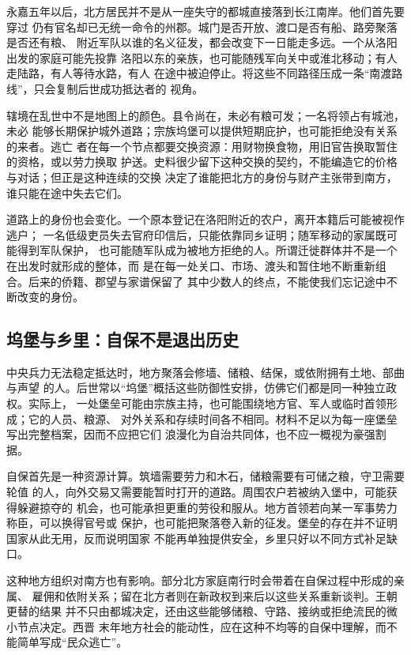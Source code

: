 永嘉五年以后，北方居民并不是从一座失守的都城直接落到长江南岸。他们首先要穿过
仍有官名却已无统一命令的州郡。城门是否开放、渡口是否有船、路旁聚落是否还有粮、
附近军队以谁的名义征发，都会改变下一日能走多远。一个从洛阳出发的家庭可能先投靠
洛阳以东的亲族，也可能随残军向关中或淮北移动；有人走陆路，有人等待水路，有人
在途中被迫停止。将这些不同路径压成一条“南渡路线”，只会复制后世成功抵达者的
视角。

辖境在乱世中不是地图上的颜色。县令尚在，未必有粮可发；一名将领占有城池，未必
能够长期保护城外道路；宗族坞堡可以提供短期庇护，也可能拒绝没有关系的来者。逃亡
者在每一个节点都要交换资源：用财物换食物，用旧官告换取暂住的资格，或以劳力换取
护送。史料很少留下这种交换的契约，不能编造它的价格与对话；但正是这种连续的交换
决定了谁能把北方的身份与财产主张带到南方，谁只能在途中失去它们。

道路上的身份也会变化。一个原本登记在洛阳附近的农户，离开本籍后可能被视作逃户；
一名低级吏员失去官府印信后，只能依靠同乡证明；随军移动的家属既可能得到军队保护，
也可能随军队成为被地方拒绝的人。所谓迁徙群体并不是一个在出发时就形成的整体，而
是在每一处关口、市场、渡头和暂住地不断重新组合。后来的侨籍、郡望与家谱保留了
其中少数人的终点，不能使我们忘记途中不断改变的身份。

\subsection{坞堡与乡里：自保不是退出历史}

中央兵力无法稳定抵达时，地方聚落会修墙、储粮、结保，或依附拥有土地、部曲与声望
的人。后世常以“坞堡”概括这些防御性安排，仿佛它们都是同一种独立政权。实际上，
一处堡垒可能由宗族主持，也可能围绕地方官、军人或临时首领形成；它的人员、粮源、
对外关系和存续时间各不相同。材料不足以为每一座堡垒写出完整档案，因而不应把它们
浪漫化为自治共同体，也不应一概视为豪强割据。

自保首先是一种资源计算。筑墙需要劳力和木石，储粮需要有可储之粮，守卫需要轮值
的人，向外交易又需要能暂时打开的道路。周围农户若被纳入堡中，可能获得躲避掠夺的
机会，也可能承担更重的劳役和服从。地方首领若向某一军事势力称臣，可以换得官号或
保护，也可能把聚落卷入新的征发。堡垒的存在并不证明国家从此无用，反而说明国家
不能再单独提供安全，乡里只好以不同方式补足缺口。

这种地方组织对南方也有影响。部分北方家庭南行时会带着在自保过程中形成的亲属、
雇佣和依附关系；留在北方者则在新政权到来后以这些关系重新谈判。王朝更替的结果
并不只由都城决定，还由这些能够储粮、守路、接纳或拒绝流民的微小节点决定。西晋
末年地方社会的能动性，应在这种不均等的自保中理解，而不能简单写成“民众逃亡”。

